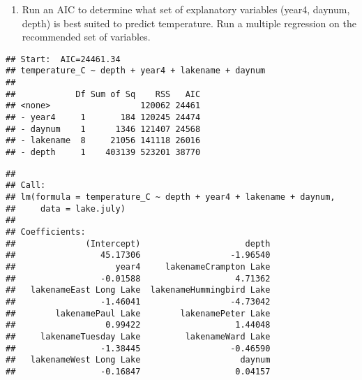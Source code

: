 \documentclass[]{article}
\newenvironment{Shaded}{\begin{snugshade}}{\end{snugshade}}
\newcommand{\CommentTok}[1]{\textcolor[rgb]{0.56,0.35,0.01}{\textit{#1}}}
\newcommand{\DataTypeTok}[1]{\textcolor[rgb]{0.13,0.29,0.53}{#1}}
\newcommand{\DecValTok}[1]{\textcolor[rgb]{0.00,0.00,0.81}{#1}}
\newcommand{\KeywordTok}[1]{\textcolor[rgb]{0.13,0.29,0.53}{\textbf{#1}}}
\newcommand{\NormalTok}[1]{#1}
\newcommand{\OperatorTok}[1]{\textcolor[rgb]{0.81,0.36,0.00}{\textbf{#1}}}
\newcommand{\StringTok}[1]{\textcolor[rgb]{0.31,0.60,0.02}{#1}}
\providecommand{\tightlist}{%
  \setlength{\itemsep}{0pt}\setlength{\parskip}{0pt}}
\begin{document}
\begin{enumerate}
\def\labelenumi{\arabic{enumi}.}
\setcounter{enumi}{3}
\tightlist
\item
  Run an AIC to determine what set of explanatory variables (year4,
  daynum, depth) is best suited to predict temperature. Run a multiple
  regression on the recommended set of variables.
\end{enumerate}

\begin{Shaded}
\end{Shaded}

\begin{verbatim}
## Start:  AIC=24461.34
## temperature_C ~ depth + year4 + lakename + daynum
## 
##            Df Sum of Sq    RSS   AIC
## <none>                  120062 24461
## - year4     1       184 120245 24474
## - daynum    1      1346 121407 24568
## - lakename  8     21056 141118 26016
## - depth     1    403139 523201 38770
\end{verbatim}

\begin{verbatim}
## 
## Call:
## lm(formula = temperature_C ~ depth + year4 + lakename + daynum, 
##     data = lake.july)
## 
## Coefficients:
##              (Intercept)                     depth  
##                 45.17306                  -1.96540  
##                    year4     lakenameCrampton Lake  
##                 -0.01588                   4.71362  
##   lakenameEast Long Lake  lakenameHummingbird Lake  
##                 -1.46041                  -4.73042  
##        lakenamePaul Lake        lakenamePeter Lake  
##                  0.99422                   1.44048  
##     lakenameTuesday Lake         lakenameWard Lake  
##                 -1.38445                  -0.46590  
##   lakenameWest Long Lake                    daynum  
##                 -0.16847                   0.04157
\end{verbatim}
\end{document}
